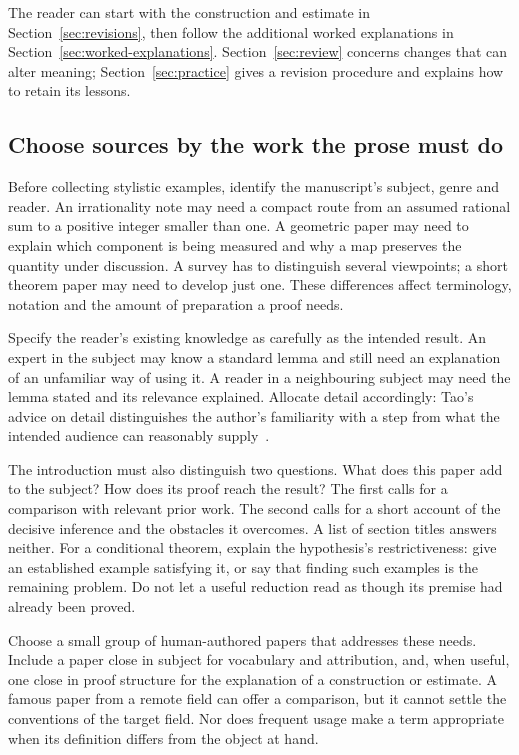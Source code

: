 The reader can start with the construction and estimate in
Section~\ref{sec:revisions}, then follow the additional worked explanations in
Section~\ref{sec:worked-explanations}. Section~\ref{sec:review} concerns changes
that can alter meaning; Section~\ref{sec:practice} gives a revision procedure
and explains how to retain its lessons.

\subsection{Choose sources by the work the prose must do}

Before collecting stylistic examples, identify the manuscript's subject, genre
and reader. An irrationality note may need a compact route from an assumed
rational sum to a positive integer smaller than one. A geometric paper may need
to explain which component is being measured and why a map preserves the
quantity under discussion. A survey has to distinguish several viewpoints; a
short theorem paper may need to develop just one. These differences affect
terminology, notation and the amount of preparation a proof needs.

Specify the reader's existing knowledge as carefully as the intended result.
An expert in the subject may know a standard lemma and still need an explanation
of an unfamiliar way of using it. A reader in a neighbouring subject may need
the lemma stated and its relevance explained. Allocate detail accordingly:
Tao's advice on detail distinguishes the author's familiarity with a step from
what the intended audience can reasonably supply~\cite{tao-detail}.

The introduction must also distinguish two questions. What does this paper add
to the subject? How does its proof reach the result? The first calls for a
comparison with relevant prior work. The second calls for a short account of
the decisive inference and the obstacles it overcomes. A list of section titles
answers neither. For a conditional theorem, explain the hypothesis's
restrictiveness: give an established example satisfying it, or say that finding
such examples is the remaining problem. Do not let a useful reduction read as
though its premise had already been proved.

Choose a small group of human-authored papers that addresses these needs.
Include a paper close in subject for vocabulary and attribution, and, when
useful, one close in proof structure for the explanation of a construction or
estimate. A famous paper from a remote field can offer a comparison, but it
cannot settle the conventions of the target field. Nor does frequent usage
make a term appropriate when its definition differs from the object at hand.

